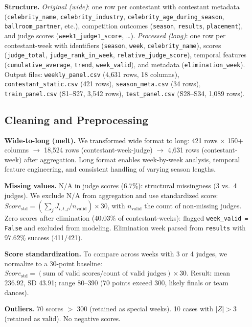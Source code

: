\documentclass{mcmthesis}
\begin{document}
\textbf{Structure.}
\textit{Original (wide)}: one row per contestant with contestant metadata (\texttt{celebrity\_name}, \texttt{celebrity\_industry}, \texttt{celebrity\_age\_during\_season}, \texttt{ballroom\_partner}, etc.), competition outcomes (\texttt{season}, \texttt{results}, \texttt{placement}), and judge scores (\texttt{week1\_judge1\_score}, \ldots). \textit{Processed (long)}: one row per contestant-week with identifiers (\texttt{season}, \texttt{week}, \texttt{celebrity\_name}), scores (\texttt{judge\_total}, \texttt{judge\_rank\_in\_week}, \texttt{relative\_judge\_score}), temporal features (\texttt{cumulative\_average}, \texttt{trend}, \texttt{week\_valid}), and metadata (\texttt{elimination\_week}). Output files: \texttt{weekly\_panel.csv} (4,631 rows, 18 columns), \texttt{contestant\_static.csv} (421 rows), \texttt{season\_meta.csv} (34 rows), \texttt{train\_panel.csv} (S1--S27, 3,542 rows), \texttt{test\_panel.csv} (S28--S34, 1,089 rows).

\subsection{Cleaning and Preprocessing}

\textbf{Wide-to-long (melt).}
We transformed wide format to long: 421 rows $\times$ 150+ columns $\to$ 18,524 rows (contestant-week-judge) $\to$ 4,631 rows (contestant-week) after aggregation. Long format enables week-by-week analysis, temporal feature engineering, and consistent handling of varying season lengths.

\textbf{Missing values.}
N/A in judge scores (6.7\%): structural missingness (3 vs.\ 4 judges). We exclude N/A from aggregation and use standardized score:
$Score_{\text{std}} = (\sum_j J_{i,t,j} / n_{\text{valid}}) \times 30$, with $n_{\text{valid}}$ the count of non-missing judges. Zero scores after elimination (40.03\% of contestant-weeks): flagged \texttt{week\_valid = False} and excluded from modeling. Elimination week parsed from \texttt{results} with 97.62\% success (411/421).

\textbf{Score standardization.}
To compare across weeks with 3 or 4 judges, we normalize to a 30-point baseline: $Score_{\text{std}} = (\text{sum of valid scores} / \text{count of valid judges}) \times 30$. Result: mean 236.92, SD 43.91; range 80--390 (70 points exceed 300, likely finals or team dances).

\textbf{Outliers.}
70 scores $>$ 300 (retained as special weeks). 10 cases with $|Z| > 3$ (retained as valid). No negative scores.
\end{document}
